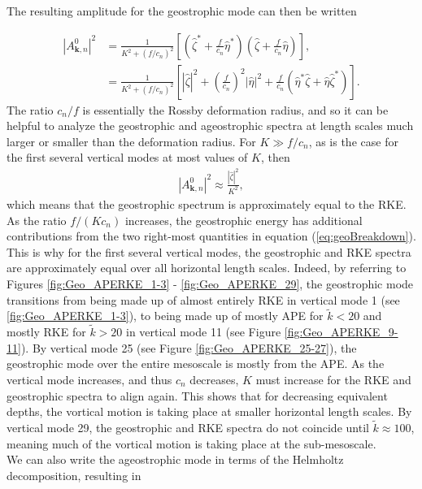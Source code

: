 The resulting amplitude for the geostrophic mode can then be written 

\begin{align}
|A^0_{\mathbf{k},n}|^2 &= \frac{1}{K^2 + (f/c_n)^2} \left[ \left(\widehat{\zeta}^* + \frac{f}{c_n} \widehat{\eta}^*\right) \left(\widehat{\zeta} + \frac{f}{c_n} \widehat{\eta}\right)\right],\\
&= \frac{1}{K^2 + (f/c_n)^2} \left[ |\widehat{\zeta}|^2 + \left(\frac{f}{c_n}\right)^2 |\widehat{\eta}|^2 + \frac{f}{c_n} \left(\widehat{\eta}^*\widehat{\zeta} + \widehat{\eta}\widehat{\zeta}^*\right)\right]\label{eq:geoBreakdown}.
\end{align}
The ratio $c_n/f$ is essentially the Rossby deformation radius, and so it can be helpful to analyze the geostrophic and ageostrophic spectra at length scales much larger or smaller than the deformation radius. For $ K \gg f/c_n$, as is the case for the first several vertical modes at most values of $K$, then 
\begin{align}
|A^0_{\mathbf{k},n}|^2 \approx \frac{|\widehat{\zeta}|^2}{K^2},
\end{align}
which means that the geostrophic spectrum is approximately equal to the RKE. As the ratio $f/(Kc_n)$ increases, the geostrophic energy has additional contributions from the two right-most quantities in equation (\ref{eq:geoBreakdown}). This is why for the first several vertical modes, the geostrophic and RKE spectra are approximately equal over all horizontal length scales. Indeed, by referring to Figures \ref{fig:Geo_APERKE_1-3} - \ref{fig:Geo_APERKE_29}, the geostrophic mode transitions from being made up of almost entirely RKE in vertical mode 1 (see \ref{fig:Geo_APERKE_1-3}), to being made up of mostly APE for $\tilde{k} < 20$ and mostly RKE for $\tilde{k} > 20$ in vertical mode 11 (see Figure \ref{fig:Geo_APERKE_9-11}). By vertical mode 25 (see Figure \ref{fig:Geo_APERKE_25-27}), the geostrophic mode over the entire mesoscale is mostly from the APE.  As the vertical mode increases, and thus $c_n$ decreases, $K$ must increase for the RKE and geostrophic spectra to align again. This shows that for decreasing equivalent depths, the vortical motion is taking place at smaller horizontal length scales. By vertical mode 29, the geostrophic and RKE spectra do not coincide until $\tilde{k} \approx 100$, meaning much of the vortical motion is taking place at the sub-mesoscale.\\

We can also write the ageostrophic mode in terms of the Helmholtz decomposition, resulting in

